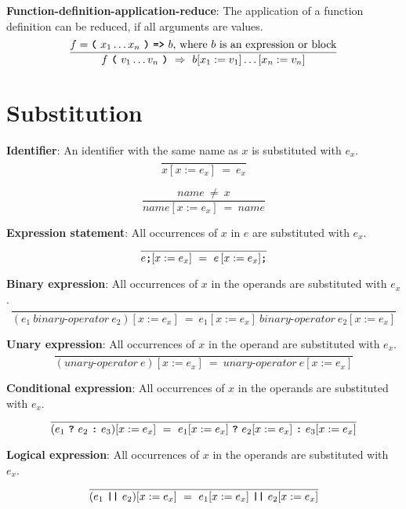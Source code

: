 \vspace{10mm}
\textbf{Function-definition-application-reduce}:
The application of a function definition
can be reduced, if all
arguments are values. 
\[
\frac{
  f = \textbf{\texttt{(}}\  x_1 \ldots x_n
                 \ \textbf{\texttt{)}}\ \textbf{\texttt{=>}}\ b
                   \mbox{, where $b$ is an expression or block}
}{
  f\ \textbf{\texttt{(}}\ v_1 \ldots v_n\ \textbf{\texttt{)}}
  \ \Rightarrow \ 
  b [x_1 := v_1]\ldots[x_n := v_n]
}
\]

\pagebreak

\section*{Substitution}

\textbf{Identifier}: An identifier with the same name as $x$ is substituted with $e_x$.
\[
\frac{
}{
  x[x := e_x]
  \ = \ 
  e_x
}
\]

\[
\frac{
\textit{name}
\ \neq \ 
x
}{
  \textit{name} [x := e_x] 
  \ = \ 
  \textit{name}
}
\]

\vspace{10mm}
\textbf{Expression statement}: All occurrences of $x$ in $e$ are substituted with $e_x$.
\[
\frac{
}{
  e\textbf{\texttt{;}}[x := e_x]
  \ = \ 
  e\,[x := e_x]\textbf{\texttt{;}}
}
\]

\vspace{10mm}
\textbf{Binary expression}: All occurrences of $x$ in the operands are substituted with $e_x$.
\[
\frac{
}{
  (e_1 \  \textit{binary-operator} \ e_2)[x := e_x] 
  \ = \ 
  e_1[x := e_x] \ \textit{binary-operator} \ e_2[x := e_x]
}
\]

\vspace{10mm}
\textbf{Unary expression}: All occurrences of $x$ in the operand are substituted with $e_x$.
\[
\frac{
}{
  (\textit{unary-operator} \ e)[x := e_x]
  \ = \ 
  \textit{unary-operator} \ e[x := e_x]
}
\]

\vspace{10mm}
\textbf{Conditional expression}: All occurrences of $x$ in the operands are substituted with $e_x$.
\[
\frac{
}{
  (e_1\  \textbf{\texttt{?}}\ e_2\ \textbf{\texttt{:}}\ e_3)[x := e_x]
  \ = \ 
  e_1[x := e_x]\  \textbf{\texttt{?}}\ e_2[x := e_x]\ \textbf{\texttt{:}}\ e_3[x := e_x]
}
\]

\vspace{10mm}
\textbf{Logical expression}: All occurrences of $x$ in the operands are substituted with $e_x$.
\[
\frac{
}{
  (e_1\  \textbf{\texttt{||}}\ e_2)[x := e_x]
  \ = \ 
  e_1[x := e_x]\  \textbf{\texttt{||}}\ e_2[x := e_x]
}
\]


